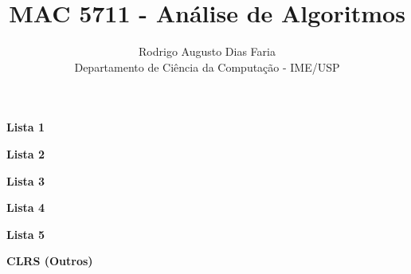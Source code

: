 \documentclass[12pt]{article}
\begin{document}
 
 
 
\title{MAC 5711 - Análise de Algoritmos}
\author{Rodrigo Augusto Dias Faria\\
Departamento de Ciência da Computação - IME/USP}
 
\maketitle
 
\begin{center} 
\textbf{\large{Lista 1}}
\end{center}




\clearpage
\begin{center} 
\textbf{\large{Lista 2}}
\end{center}



\clearpage
\begin{center} 
\textbf{\large{Lista 3}}
\end{center}





\clearpage

\begin{center} 
\textbf{\large{Lista 4}}
\end{center}






\clearpage

\begin{center} 
\textbf{\large{Lista 5}}
\end{center}




\clearpage

\begin{center} 
\textbf{\large{CLRS (Outros)}}
\end{center}


\end{document}

